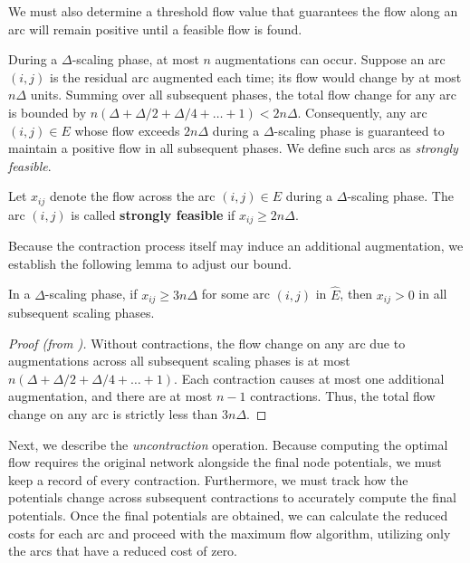 We must also determine a threshold flow value that guarantees the flow along an arc will remain positive until a feasible flow is found.

During a $\Delta$-scaling phase, at most $n$ augmentations can occur. Suppose an arc $(i,j)$ is the residual arc augmented each time; its flow would change by at most $n\Delta$ units. Summing over all subsequent phases, the total flow change for any arc is bounded by $n(\Delta + \Delta/2 + \Delta/4 + \dots + 1) < 2n\Delta$. Consequently, any arc $(i,j) \in E$ whose flow exceeds $2n\Delta$ during a $\Delta$-scaling phase is guaranteed to maintain a positive flow in all subsequent phases. We define such arcs as \textit{strongly feasible}.

\begin{defn}\label{def:strongly_feasible}
    Let $x_{ij}$ denote the flow across the arc $(i,j)\in E$ during a $\Delta$-scaling phase. The arc $(i,j)$ is called \textbf{strongly feasible} if $x_{ij} \geq 2n\Delta$.
\end{defn}

Because the contraction process itself may induce an additional augmentation, we establish the following lemma to adjust our bound.

\begin{lemma}
In a $\Delta$-scaling phase, if $x_{ij} \geq 3n\Delta$ for some arc $(i,j)$ in $\hat{E}$, then $x_{ij} > 0$ in all subsequent scaling phases.
\end{lemma}

\begin{proof}[Proof (from {\cite[p.~346]{orlin1993faster}})]
    Without contractions, the flow change on any arc due to augmentations across all subsequent scaling phases is at most $n(\Delta + \Delta/2 +\Delta/4+ \dots + 1)$. Each contraction causes at most one additional augmentation, and there are at most $n-1$ contractions. Thus, the total flow change on any arc is strictly less than $3n\Delta$.
\end{proof}

Next, we describe the \textit{uncontraction} operation. Because computing the optimal flow requires the original network alongside the final node potentials, we must keep a record of every contraction. Furthermore, we must track how the potentials change across subsequent contractions to accurately compute the final potentials. Once the final potentials are obtained, we can calculate the reduced costs for each arc and proceed with the maximum flow algorithm, utilizing only the arcs that have a reduced cost of zero.


